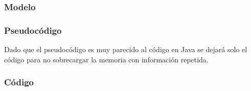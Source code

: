 \documentclass[11pt,a4paper]{article}
\begin{document}
\subsubsection{Modelo}

\begin{figure}[H]
\end{figure}

\subsubsection{Pseudocódigo}

Dado que el pseudocódigo es muy parecido al código en Java se dejará solo el código para no sobrecargar la memoria con información repetida.


\subsubsection{Código}








\end{document}
